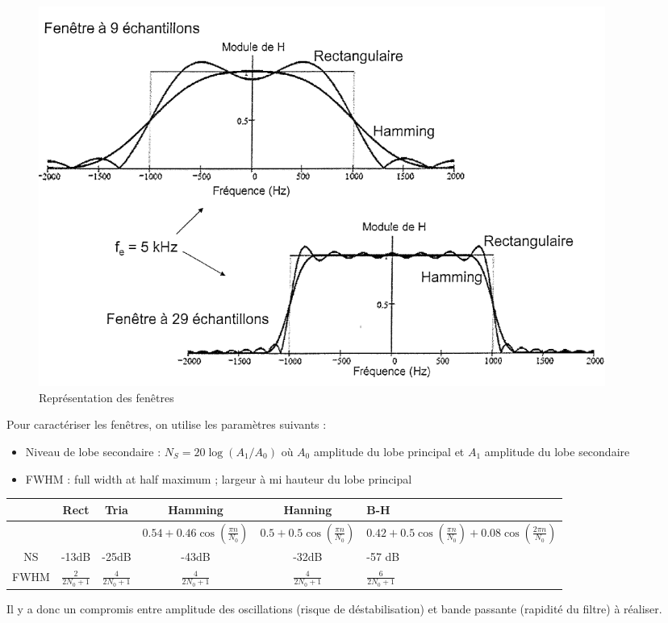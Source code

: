 \documentclass[main.tex]{subfiles}
\begin{document}
\begin{figure}[H]
  \begin{center}
    \includegraphics[width=0.9\textwidth]{poly}
    \caption{Représentation des fenêtres}
  \end{center}
\end{figure}

Pour caractériser les fenêtres, on utilise les paramètres suivants :
\begin{itemize}
\item Niveau de lobe secondaire : $N_S = 20\log(A_1/A_0)$ où $A_0$ amplitude du lobe principal et $A_1$ amplitude du lobe secondaire
\item FWHM : full width at half maximum ; largeur à mi hauteur du lobe principal
\end{itemize}

\begin{center}
\renewcommand{\arraystretch}{1.5}
\begin{tabular}{|c|c|c|c|c|p{4cm}|}
\hline
& Rect & Tria & Hamming  & Hanning  & B-H \\
\hline
& & & $0.54+0.46\cos(\frac{\pi n}{N_0})$ & $0.5+0.5\cos(\frac{\pi n}{N_0})$ & $0.42 + 0.5 \cos(\frac{\pi n}{N_0}) + 0.08\cos(\frac{2\pi n}{N_0})$ \\
\hline
NS & -13dB & -25dB & -43dB & -32dB & -57 dB \\
\hline
FWHM & $\frac{2}{2N_0 +1}$ & $\frac{4}{2N_0 +1}$ & $\frac{4}{2N_0 +1}$ & $\frac{4}{2N_0 +1}$ & $\frac{6}{2N_0 +1}$\\
\hline
\end{tabular}
\end{center}

Il y a donc un compromis entre amplitude des oscillations (risque de déstabilisation) et bande passante (rapidité du filtre) à réaliser.
\end{document}
